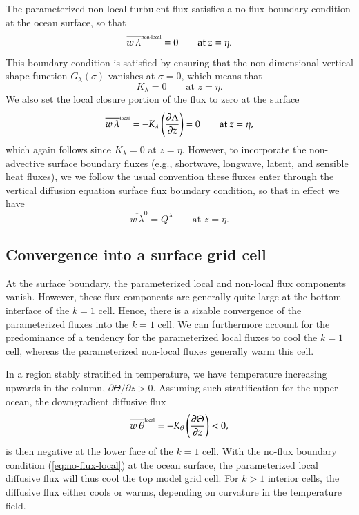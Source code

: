 The parameterized non-local turbulent flux satisfies a no-flux
boundary condition at the ocean surface, so that
\begin{equation}
  \overline{w \, \lambda}^{\mbox{\tiny non-local}} = 0 \qquad \mbox{at $z=\eta$}.
\label{eq:non-local-surface-bc}
\end{equation}
This boundary condition is satisfied by ensuring that the
non-dimensional vertical shape function $G_{\lambda}(\sigma)$ vanishes
at $\sigma = 0$, which means that
\begin{equation}
   K_{\lambda}  = 0   \qquad \mbox{at $z=\eta$}.
\end{equation}
We also set the local closure portion of the flux to zero at the
surface
\begin{equation}
\overline{w \, \lambda}^{\mbox{\tiny local}} = -K_{\lambda} \left( \frac{\partial \Lambda}{\partial z} \right) = 
 0  \qquad \mbox{at $z=\eta$},
\label{eq:no-flux-local}
\end{equation}
which again follows since $K_{\lambda} = 0$ at $z=\eta$.  However, to
incorporate the non-advective surface boundary fluxes (e.g.,
shortwave, longwave, latent, and sensible heat fluxes), we we follow
the usual convention these fluxes enter through the vertical diffusion
equation surface flux boundary condition, so that in effect we have
\begin{equation}
\overline{w \, \lambda}^{0}  = Q^{\lambda}  \qquad \mbox{at $z=\eta$}. 
\label{eq:surface-boundary-flux}
\end{equation}


\subsection{Convergence into a surface grid cell}
\label{subsection:kpp-surface-cell-tendency}

At the surface boundary, the parameterized local and non-local flux
components vanish.  However, these flux components are generally quite
large at the bottom interface of the $k=1$ cell.  Hence, there is a
sizable convergence of the parameterized fluxes into the $k=1$ cell.
We can furthermore account for the predominance of a tendency for the
parameterized local fluxes to cool the $k=1$ cell, whereas the
parameterized non-local fluxes generally warm this cell.

In a region stably stratified in temperature, we have temperature
increasing upwards in the column, $\partial \Theta / \partial z >
0$. Assuming such stratification for the upper ocean, the downgradient
diffusive flux
\begin{equation}
\overline{w \, \theta}^{\mbox{\tiny local}} = -K_{\theta} \left( \frac{\partial \Theta}{\partial z} \right) < 0,
\end{equation}
is then negative at the lower face of the $k=1$ cell.  With the
no-flux boundary condition (\ref{eq:no-flux-local}) at the ocean
surface, the parameterized local diffusive flux will thus cool the top
model grid cell. For $k > 1$ interior cells, the diffusive flux either
cools or warms, depending on curvature in the temperature field.

